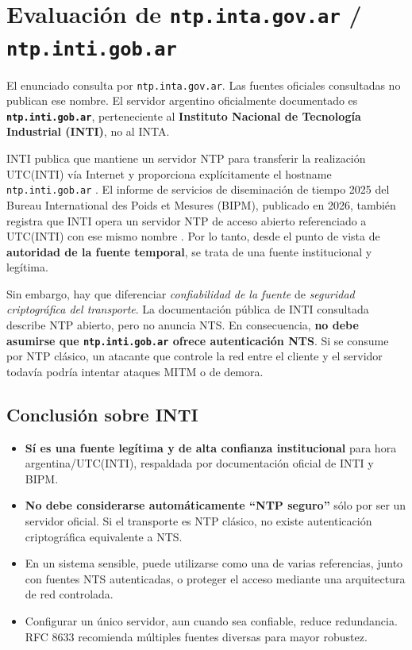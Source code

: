\documentclass[11pt,a4paper]{article}
\begin{document}
\section{Evaluación de \texttt{ntp.inta.gov.ar} / \texttt{ntp.inti.gob.ar}}

El enunciado consulta por \texttt{ntp.inta.gov.ar}. Las fuentes oficiales consultadas no publican ese nombre. El servidor argentino oficialmente documentado es \textbf{\texttt{ntp.inti.gob.ar}}, perteneciente al \textbf{Instituto Nacional de Tecnología Industrial (INTI)}, no al INTA.

INTI publica que mantiene un servidor NTP para transferir la realización UTC(INTI) vía Internet y proporciona explícitamente el hostname \texttt{ntp.inti.gob.ar} \cite{inti}. El informe de servicios de diseminación de tiempo 2025 del Bureau International des Poids et Mesures (BIPM), publicado en 2026, también registra que INTI opera un servidor NTP de acceso abierto referenciado a UTC(INTI) con ese mismo nombre \cite{bipm2025}. Por lo tanto, desde el punto de vista de \textbf{autoridad de la fuente temporal}, se trata de una fuente institucional y legítima.

Sin embargo, hay que diferenciar \emph{confiabilidad de la fuente} de \emph{seguridad criptográfica del transporte}. La documentación pública de INTI consultada describe NTP abierto, pero no anuncia NTS. En consecuencia, \textbf{no debe asumirse que \texttt{ntp.inti.gob.ar} ofrece autenticación NTS}. Si se consume por NTP clásico, un atacante que controle la red entre el cliente y el servidor todavía podría intentar ataques MITM o de demora.

\subsection{Conclusión sobre INTI}

\begin{itemize}
    \item \textbf{Sí es una fuente legítima y de alta confianza institucional} para hora argentina/UTC(INTI), respaldada por documentación oficial de INTI y BIPM.
    \item \textbf{No debe considerarse automáticamente ``NTP seguro''} sólo por ser un servidor oficial. Si el transporte es NTP clásico, no existe autenticación criptográfica equivalente a NTS.
    \item En un sistema sensible, puede utilizarse como una de varias referencias, junto con fuentes NTS autenticadas, o proteger el acceso mediante una arquitectura de red controlada.
    \item Configurar un único servidor, aun cuando sea confiable, reduce redundancia. RFC 8633 recomienda múltiples fuentes diversas para mayor robustez.
\end{itemize}
\end{document}
